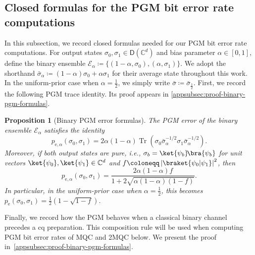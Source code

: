 \documentclass[11pt]{article}
\newtheorem{prop}[prop]{Proposition}
\theoremstyle{remark}
\newcommand{\ketbra}[2]{\ket{#1}\!\bra{#2}}
\newcommand{\cE}{\mathcal{E}}
\newcommand{\C}{\mathbb{C}}
\newcommand{\Tr}{\operatorname{Tr}}
\newcommand{\Dens}{\mathsf{D}}
\newcommand{\abs}[1]{\left|#1\right|}
\begin{document}
\subsection{Closed formulas for the PGM bit error rate computations}
\label{subsec:pgm-bit-error-formulas}


In this subsection, we record closed formulas needed for our PGM bit error rate computations. For output states $\sigma_0,\sigma_1 \in \Dens(\C^d)$ and bias parameter $\alpha \in [0,1]$, define the binary ensemble $\cE_\alpha \coloneqq \{(1-\alpha,\sigma_0),(\alpha,\sigma_1)\}$. We adopt the shorthand $\bar{\sigma}_\alpha \coloneqq (1-\alpha)\sigma_0+\alpha \sigma_1$ for their average state throughout this work. In the uniform-prior case when $\alpha = \frac{1}{2}$, we simply write $\bar{\sigma} \coloneqq \bar{\sigma}_{\frac{1}{2}}$. First, we record the following PGM trace identity. Its proof appears in \cref{appsubsec:proof-binary-pgm-formulas}.

\begin{prop}[Binary PGM error formulas]
\label{prop:binary-pgm-error}
The PGM error of the binary ensemble $\cE_\alpha$ satisfies the identity
\begin{equation}
\label{eq:binary-pgm-error}
p_{\mathrm{e},\alpha}(\sigma_0,\sigma_1)
= 2\alpha(1-\alpha)\Tr\left(\sigma_0\bar{\sigma}_\alpha^{-1/2}\sigma_1\bar{\sigma}_\alpha^{-1/2}\right).
\end{equation}
Moreover, if both output states are pure, i.e., $\sigma_b = \ketbra{\psi_b}{\psi_b}$ for unit vectors $\ket{\psi_0},\ket{\psi_1} \in \C^d$ and $f \coloneqq \abs{\braket{\psi_0|\psi_1}}^2$, then
\begin{equation}
\label{eq:non-uniform-pure-pgm-error}
p_{\mathrm{e},\alpha}(\sigma_0,\sigma_1)
= \frac{2\alpha(1-\alpha)f}{1+2\sqrt{\alpha(1-\alpha)(1-f)}}.
\end{equation}
In particular, in the uniform-prior case when $\alpha = \frac{1}{2}$, this becomes $p_{\mathrm{e}}(\sigma_0,\sigma_1) = \frac{1}{2}(1-\sqrt{1-f})$.
\end{prop}

Finally, we record how the PGM behaves when a classical binary channel precedes a cq preparation. This composition rule will be used when computing PGM bit error rates of MQC and 2MQC below. We present the proof in~\cref{appsubsec:proof-binary-pgm-formulas}.
\end{document}
